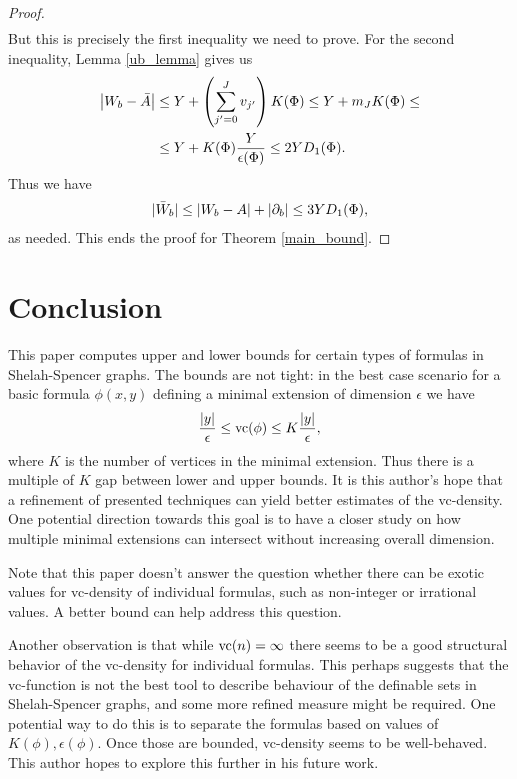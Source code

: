 \documentclass{amsart}
\begin{document}
\begin{proof}
\begin{align*}
  \end{align*}
  But this is precisely the first inequality we need to prove.
  For the second inequality, Lemma \ref{ub_lemma} gives us
  \begin{align*}
    \left|W_b - \bar A\right| &\leq Y + \left(\sum_{j'=0}^J v_{j'}\right) K(\Phi) \leq Y + m_J K(\Phi) \leq \\
    &\leq Y + K(\Phi) \frac{Y}{\epsilon(\Phi)} \leq 2 Y D_1(\Phi).
  \end{align*}
  Thus we have
  \begin{align*}
      |\bar W_b| \leq \left|W_b - A\right| + \left|\partial_b\right| \leq 3 Y D_1(\Phi),
  \end{align*}
  as needed.
  This ends the proof for Theorem \ref{main_bound}.
\end{proof}


\section{Conclusion}
This paper computes upper and lower bounds for certain types of formulas in Shelah-Spencer graphs.
The bounds are not tight: in the best case scenario for a basic formula $\phi(x,y)$ defining a minimal extension of
dimension $\epsilon$ we have
\begin{align*}
  \frac{|y|}{\epsilon} \leq \operatorname{vc}(\phi) \leq K \frac{|y|}{\epsilon},
\end{align*}
where $K$ is the number of vertices in the minimal extension.
Thus there is a multiple of $K$ gap between lower and upper bounds.
It is this author's hope that a refinement of presented techniques can yield better estimates of the vc-density.
One potential direction towards this goal is to have a closer study on
how multiple minimal extensions can intersect without increasing overall dimension.

Note that this paper doesn't answer the question whether there can be exotic values for vc-density of individual formulas,
such as non-integer or irrational values.
A better bound can help address this question.

Another observation is that while $\operatorname{vc}(n) = \infty$ there seems to be a good structural behavior of the vc-density for individual formulas.
This perhaps suggests that the vc-function is not the best tool to describe behaviour of the definable sets in Shelah-Spencer graphs,
and some more refined measure might be required.
One potential way to do this is to separate the formulas based on values of $K(\phi), \epsilon(\phi)$.
Once those are bounded, vc-density seems to be well-behaved.
This author hopes to explore this further in his future work.
\end{document}
